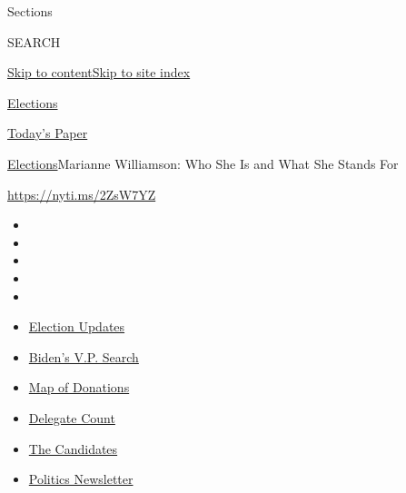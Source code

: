 Sections

SEARCH

\protect\hyperlink{site-content}{Skip to
content}\protect\hyperlink{site-index}{Skip to site index}

\href{https://www.nytimes.com/news-event/2020-election}{Elections}

\href{https://myaccount.nytimes.com/auth/login?response_type=cookie\&client_id=vi}{}

\href{https://www.nytimes.com/section/todayspaper}{Today's Paper}

\href{/news-event/2020-election}{Elections}\textbar{}Marianne
Williamson: Who She Is and What She Stands For

\url{https://nyti.ms/2ZsW7YZ}

\begin{itemize}
\item
\item
\item
\item
\item
\end{itemize}

\begin{itemize}
\item
  \href{https://www.nytimes.com/2020/07/31/us/elections/biden-vs-trump.html?action=click\&pgtype=Article\&state=default\&region=TOP_BANNER\&context=storylines_menu}{Election
  Updates}
\item
  \href{https://www.nytimes.com/article/biden-vice-president-2020.html?action=click\&pgtype=Article\&state=default\&region=TOP_BANNER\&context=storylines_menu}{Biden's
  V.P. Search}
\item
  \href{https://www.nytimes.com/interactive/2020/07/24/us/politics/trump-biden-campaign-donors.html?action=click\&pgtype=Article\&state=default\&region=TOP_BANNER\&context=storylines_menu}{Map
  of Donations}
\item
  \href{https://www.nytimes.com/interactive/2020/us/elections/delegate-count-primary-results.html?action=click\&pgtype=Article\&state=default\&region=TOP_BANNER\&context=storylines_menu}{Delegate
  Count}
\item
  \href{https://www.nytimes.com/interactive/2019/us/politics/2020-presidential-candidates.html?action=click\&pgtype=Article\&state=default\&region=TOP_BANNER\&context=storylines_menu}{The
  Candidates}
\item
  \href{https://www.nytimes.com/newsletters/politics?action=click\&pgtype=Article\&state=default\&region=TOP_BANNER\&context=storylines_menu}{Politics
  Newsletter}
\end{itemize}

